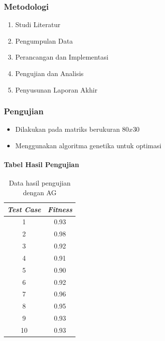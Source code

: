 \documentclass[12pt]{beamer}
\begin{document}
	
	\begin{frame}
		\frametitle{Metodologi}
		\begin{enumerate}
			\item Studi Literatur
			\item Pengumpulan Data
			\item Perancangan dan Implementasi
			\item Pengujian dan Analisis
			\item Penyusunan Laporan Akhir
		\end{enumerate}
	\end{frame}

	
	\begin{frame}
		\frametitle{Pengujian}
		\begin{itemize}
			\item Dilakukan pada matriks berukuran $80 x 30$
			\item Menggunakan algoritma genetika untuk optimasi
		\end{itemize}
		\framesubtitle{Tabel Hasil Pengujian}
		\begin{table}
			\centering
			\begin{tabular}{|c|c|}
				\hline \textbf{\emph{Test Case}} & \textbf{\emph{Fitness}} \\ 
				\hline 1 & 0.93 \\ 
				\hline 2 & 0.98 \\ 
				\hline 3 & 0.92 \\ 
				\hline 4 & 0.91 \\ 
				\hline 5 & 0.90 \\ 
				\hline 6 & 0.92 \\ 
				\hline 7 & 0.96 \\ 
				\hline 8 & 0.95 \\ 
				\hline 9 & 0.93 \\ 
				\hline 10 & 0.93 \\ 
				\hline 
			\end{tabular}
			\caption{Data hasil pengujian dengan AG}
			\label{tab:1}
		\end{table}
	\end{frame}
	
\end{document}
